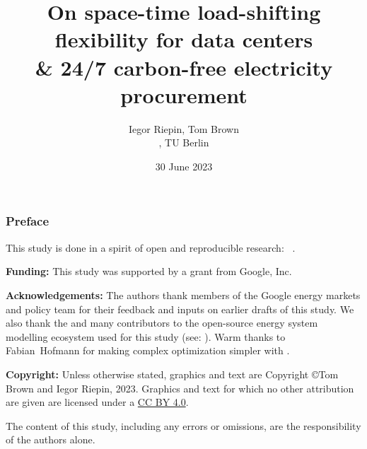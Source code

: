 


\title{On space-time load-shifting flexibility for data centers \\ 
      \& 24/7 carbon-free electricity procurement}

\author{
  Iegor Riepin, Tom Brown\\
  , TU Berlin
  }

\date{30 June 2023}




\maketitle

\begin{frame}
  \frametitle{Preface}

  \begin{itemize}
    {\small
    \item This study is done in a spirit of open and reproducible research: \faGithub~.
    \item {\bf Funding:} This study was supported by a grant from Google, Inc. 
    \item {\bf Acknowledgements:} The authors thank members of the Google energy markets and policy team 
    for their feedback and inputs on earlier drafts of this study. 
    We also thank the  and many contributors to the open-source 
    energy system modelling ecosystem used for this study (see: ).
    Warm thanks to Fabian~Hofmann for making complex optimization simpler with . 
    \item 
    {\bf Copyright:} Unless otherwise stated, graphics and text are Copyright \copyright Tom Brown and Iegor Riepin, 2023.
    Graphics and text for which no other attribution are given are licensed under a 
    \href{https://creativecommons.org/licenses/by/4.0/}{CC BY 4.0}.  {\footnotesize \ccby} 
    \item The content of this study, including any errors or omissions, are the responsibility
    of the authors alone.
    }
  \end{itemize}

\end{frame}


